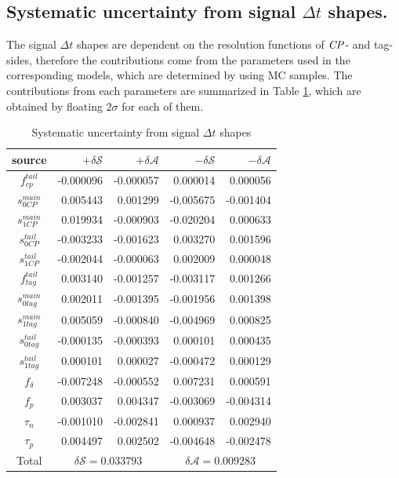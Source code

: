 \subsection{Systematic uncertainty from signal $\Delta t$ shapes.}
The signal $\Delta t$ shapes are dependent on the resolution functions of $\it{CP}$- and tag-sides, therefore the contributions come from the parameters used in the corresponding models, which are determined by using MC samples. The contributions from each parameters are summarized in Table \ref{tab:sy_sigt}, which are obtained by floating $2\sigma$ for each of them.
\begin{table}[htpb]
	\begin{minipage}[b]{1.0\linewidth}
		\centering
		\caption{Systematic uncertainty from signal $\Delta t$ shapes}
		\label{tab:sy_sigt}
		\begin{tabular}{c r r r r}
			\hline
			source & $+\delta \mathcal{S}$ & $+\delta \mathcal{A}$ & $-\delta \mathcal{S}$ &  $-\delta \mathcal{A}$\\
			\hline
			$f_{cp}^{tail}$ & -0.000096 & -0.000057
			& 0.000014
			& 0.000056
			\\
			$s_{0CP}^{main}$& 0.005443
			& 0.001299
			& -0.005675
			& -0.001404
			\\
			$s_{1CP}^{main}$ & 0.019934
			& -0.000903
			& -0.020204
			& 0.000633
			\\
			$s_{0CP}^{tail}$ &  -0.003233
			& -0.001623
			& 0.003270
			& 0.001596
			\\
			$s_{1CP}^{tail}$ & -0.002044	
			&-0.000063	
			&0.002009	
			&0.000048
			\\
			$f_{tag}^{tail}$ & 0.003140
			& -0.001257
			& -0.003117
			& 0.001266
			\\
			$s_{0tag}^{main}$&  0.002011
			& -0.001395
			& -0.001956
			& 0.001398
			\\
			$s_{1tag}^{main}$ & 0.005059
			& -0.000840
			& -0.004969
			& 0.000825
			\\
			$s_{0tag}^{tail}$ &  -0.000135
			& -0.000393
			& 0.000101 & 0.000435
			\\
			$s_{1tag}^{tail}$  & 0.000101 & 0.000027 &  -0.000472
			& 0.000129
			\\
			$f_{\delta}$ & -0.007248
			& -0.000552
			& 0.007231
			& 0.000591
			\\
			$f_p$ &  0.003037
			& 0.004347
			& -0.003069
			& -0.004314
			\\
			$\tau_n$ & -0.001010 & -0.002841
			& 0.000937
			& 0.002940
			\\
			$\tau_p$ &  0.004497
			& 0.002502
			& -0.004648
			& -0.002478
			\\
			\hline
			Total &
			\multicolumn{2}{c}{$\delta \mathcal{S}=0.033793$} &
			\multicolumn{2}{c}{$\delta \mathcal{A}=0.009283$}\\
			\hline
		\end{tabular}
	\end{minipage}
\end{table}

